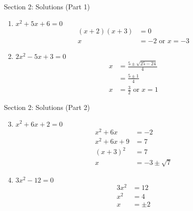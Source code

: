\documentclass[aspectratio=169]{beamer}
\begin{document}
\begin{frame}{Section 2: Solutions (Part 1)}
    \begin{tcolorbox}[colback=lightgray,colframe=accent,title=Detailed Solutions]
        \footnotesize
        \begin{enumerate}
            \item $x^2 + 5x + 6 = 0$
            \begin{align*}
                (x + 2)(x + 3) &= 0 \\
                x &= -2 \text{ or } x = -3
            \end{align*}
            
            \item $2x^2 - 5x + 3 = 0$
            \begin{align*}
                x &= \frac{5 \pm \sqrt{25 - 24}}{4} \\
                &= \frac{5 \pm 1}{4} \\
                x &= \frac{3}{2} \text{ or } x = 1
            \end{align*}
        \end{enumerate}
    \end{tcolorbox}
\end{frame}

\begin{frame}{Section 2: Solutions (Part 2)}
    \begin{tcolorbox}[colback=lightgray,colframe=accent,title=Detailed Solutions (Continued)]
        \footnotesize
        \begin{enumerate}
            \setcounter{enumi}{2}
            \item $x^2 + 6x + 2 = 0$
            \begin{align*}
                x^2 + 6x &= -2 \\
                x^2 + 6x + 9 &= 7 \\
                (x + 3)^2 &= 7 \\
                x &= -3 \pm \sqrt{7}
            \end{align*}
            
            \item $3x^2 - 12 = 0$
            \begin{align*}
                3x^2 &= 12 \\
                x^2 &= 4 \\
                x &= \pm 2
            \end{align*}
        \end{enumerate}
    \end{tcolorbox}
\end{frame}
\end{document}
